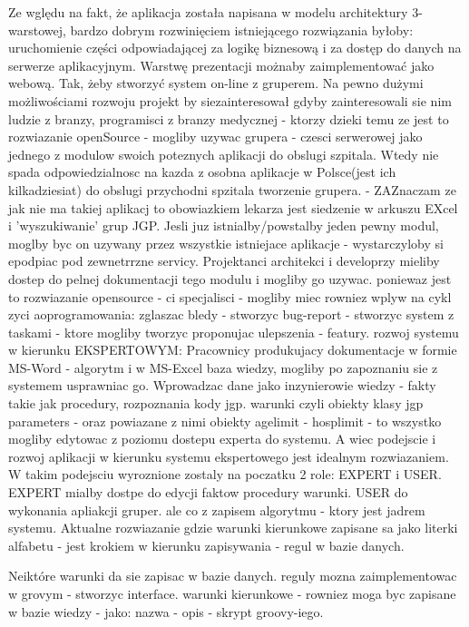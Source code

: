 Ze wględu na fakt, że aplikacja została napisana w modelu architektury 3-warstowej, bardzo dobrym rozwinięciem istniejącego rozwiązania byłoby: uruchomienie części odpowiadającej za logikę biznesową i za dostęp do danych na serwerze aplikacyjnym. Warstwę prezentacji możnaby zaimplementować jako webową. Tak, żeby stworzyć system on-line z gruperem. Na pewno dużymi możliwościami rozwoju projekt by siezainteresował gdyby zainteresowali sie nim ludzie  z branzy, programisci z branzy medycznej - ktorzy dzieki temu ze jest to rozwiazanie openSource - mogliby uzywac grupera - czesci serwerowej jako jednego z modulow swoich poteznych aplikacji do obslugi szpitala. Wtedy nie spada odpowiedzialnosc na kazda z osobna aplikacje w Polsce(jest ich kilkadziesiat) do obslugi przychodni spzitala tworzenie grupera. - ZAZnaczam ze jak nie ma takiej aplikacj to obowiazkiem lekarza jest siedzenie w arkuszu EXcel i 'wyszukiwanie' grup JGP. Jesli juz istnialby/powstalby jeden pewny modul, moglby byc on uzywany przez wszystkie istniejace aplikacje - wystarczyloby si epodpiac pod zewnetrrzne servicy. Projektanci architekci i developrzy mieliby dostep do pelnej dokumentacji tego modulu i mogliby go uzywac. poniewaz jest to rozwiazanie opensource - ci specjalisci - mogliby miec rowniez wplyw na cykl zyci aoprogramowania: zglaszac bledy - stworzyc bug-report - stworzyc system z taskami - ktore mogliby tworzyc proponujac ulepszenia - featury. 
rozwoj systemu w kierunku EKSPERTOWYM:
Pracownicy produkujacy dokumentacje w formie MS-Word - algorytm i w MS-Excel baza wiedzy, mogliby po zapoznaniu sie z systemem usprawniac go. Wprowadzac dane jako inzynierowie wiedzy - fakty takie jak procedury, rozpoznania kody jgp. warunki czyli obiekty klasy jgp parameters - oraz powiazane z nimi obiekty agelimit - hosplimit - to wszystko mogliby edytowac z poziomu dostepu experta do systemu.
A wiec podejscie i rozwoj aplikacji w kierunku systemu ekspertowego jest idealnym rozwiazaniem.
W takim podejsciu wyroznione zostaly na poczatku 2 role: EXPERT i USER.
EXPERT mialby dostpe do edycji faktow procedury warunki. USER do wykonania apliakcji gruper. ale co z zapisem algorytmu - ktory jest jadrem systemu. Aktualne rozwiazanie gdzie warunki kierunkowe zapisane sa jako literki alfabetu - jest krokiem w kierunku zapisywania - regul w bazie danych. 

Neiktóre warunki da sie zapisac w bazie danych. reguly mozna zaimplementowac w grovym - stworzyc interface. warunki kierunkowe - rowniez moga byc zapisane w bazie wiedzy - jako: nazwa - opis - skrypt groovy-iego.

